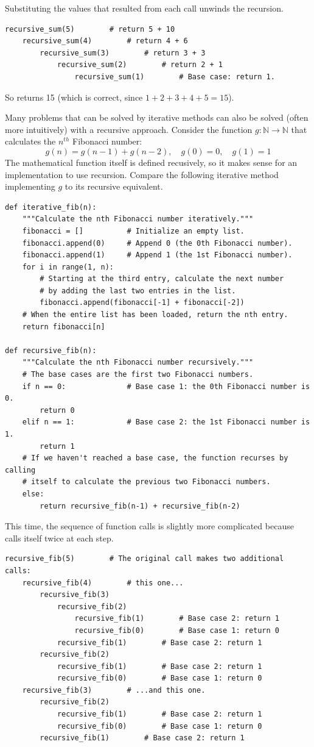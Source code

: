 Substituting the values that resulted from each call unwinds the recursion.

\begin{lstlisting}
recursive_sum(5)		# return 5 + 10
	recursive_sum(4)		# return 4 + 6
		recursive_sum(3)		# return 3 + 3
			recursive_sum(2)		# return 2 + 1
				recursive_sum(1)		# Base case: return 1.
\end{lstlisting}

So  returns 15 (which is correct, since $1 + 2 + 3 + 4 + 5 = 15$).

Many problems that can be solved by iterative methods can also be solved (often more intuitively) with a recursive approach.
Consider the function $g:\mathbb{N}\rightarrow\mathbb{N}$ that calculates the $n^{th}$ Fibonacci number:
\[g(n) = g(n-1) + g(n-2),\quad g(0)=0,\quad g(1)=1\]
The mathematical function itself is defined recusively, so it makes sense for an implementation to use recursion.
Compare the following iterative method implementing $g$ to its recursive equivalent.

\begin{lstlisting}
def iterative_fib(n):
	"""Calculate the nth Fibonacci number iteratively."""
	fibonacci = []          # Initialize an empty list.
	fibonacci.append(0)		# Append 0 (the 0th Fibonacci number).
	fibonacci.append(1)		# Append 1 (the 1st Fibonacci number).
	for i in range(1, n):
		# Starting at the third entry, calculate the next number
		# by adding the last two entries in the list.
		fibonacci.append(fibonacci[-1] + fibonacci[-2])
	# When the entire list has been loaded, return the nth entry.
	return fibonacci[n]

def recursive_fib(n):
	"""Calculate the nth Fibonacci number recursively."""
	# The base cases are the first two Fibonacci numbers.
	if n == 0:				# Base case 1: the 0th Fibonacci number is 0.
		return 0
	elif n == 1:			# Base case 2: the 1st Fibonacci number is 1.
		return 1
	# If we haven't reached a base case, the function recurses by calling
	# itself to calculate the previous two Fibonacci numbers.
	else:
		return recursive_fib(n-1) + recursive_fib(n-2)
\end{lstlisting}

This time, the sequence of function calls is slightly more complicated because  calls itself twice at each step.

\begin{lstlisting}
recursive_fib(5)		# The original call makes two additional calls:
	recursive_fib(4)		# this one...
		recursive_fib(3)
			recursive_fib(2)
				recursive_fib(1)		# Base case 2: return 1
				recursive_fib(0)		# Base case 1: return 0
			recursive_fib(1)		# Base case 2: return 1
		recursive_fib(2)
			recursive_fib(1)		# Base case 2: return 1
			recursive_fib(0)		# Base case 1: return 0
	recursive_fib(3)		# ...and this one.
		recursive_fib(2)
			recursive_fib(1)		# Base case 2: return 1
			recursive_fib(0)		# Base case 1: return 0
		recursive_fib(1)		# Base case 2: return 1
\end{lstlisting}

